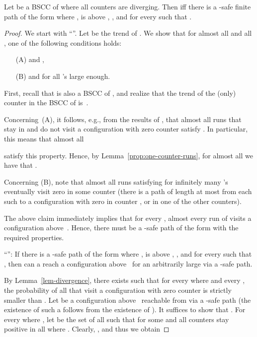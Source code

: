 \begin{lemma}
\label{lem-diverging}
  Let  be a BSCC of  where all counters are diverging.
  Then  iff there is a -safe finite 
  path of the form 
  where ,  is above , ,
  and  for every  such that . 


\end{lemma}
\begin{proof}
  We start with ``''. 
  Let  be the trend of . We show that for almost
  all  and all , one of
  the following conditions holds:
  \begin{enumerate}
  \item[(A)]  and ,
  \item[(B)]  and  
    for all 's large enough.
  \end{enumerate}
  First, recall that  is also a BSCC of , and realize that
  the trend of the (only) counter in the BSCC  of  is~.

  Concerning~(A), it follows, e.g., from the results of
  \cite{BKK:pOC-time-LTL-martingale}, that almost all runs
   that stay
  in  and do not visit a configuration with zero counter 
  satisfy .
  In particular, this means that almost all 
  
  satisfy this property.
  Hence, by Lemma~\ref{prop:one-counter-runs}, for almost all 
   we have that
  \mbox{}.

  Concerning (B), note that almost all runs 
  satisfying 
  for infinitely many 's eventually visit zero in some counter 
  (there is a path of length at most  from each such
   to a configuration with zero in counter , or in one of the
  other counters).  

  The above claim immediately implies that for every , 
  almost every run of  visits a configuration 
   above~. Hence, there must be a -safe 
  path of the form 
  with the required properties.


  ``'': If there is a -safe 
  path of the form 
  where ,  is above , ,
  and  for every  such that , then
   can a reach a configuration  above~ for an 
  arbitrarily large  via a -safe path.

  By Lemma~\ref{lem-divergence}, there exists
   such that for every  where 
   and every ,
  the probability of all  that 
  visit a configuration with zero counter is strictly smaller than 
  \mbox{}. Let  be a configuration above~ reachable
  from  via a -safe path (the existence of such 
  a  follows from the existence of
  ). It suffices
  to show that . For every 
   where ,
  let  be the set of all  such that
   for some  and
  all counters stay positive in all  where . 
  Clearly, , and thus we obtain
  
\end{proof}

